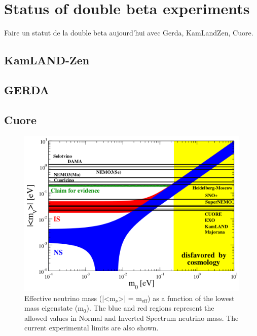 \documentclass[main.tex]{subfiles}
\begin{document}
\section{Status of double beta experiments}\label{sec:Status0nubb}
\NI Faire un statut de la double beta aujourd'hui avec 
\NI Gerda, KamLandZen, Cuore.
\subsection{KamLAND-Zen}
\subsection{GERDA}
\subsection{Cuore}

\begin{figure}[h!]
\begin{center}
\includegraphics[scale=0.30]{pictures/Chap2/m_eff_neutrino.png}
\caption{Effective neutrino mass (|<m$_{\nu}$>| = m$_{\text{eff}}$) as a function of the lowest mass eigenstate (m$_\text{0}$). The blue and red regions represent the allowed values in Normal and Inverted Spectrum neutrino mass. The current experimental limits are also shown.}
\label{mEff}
\end{center}
\end{figure}









 
\end{document}
